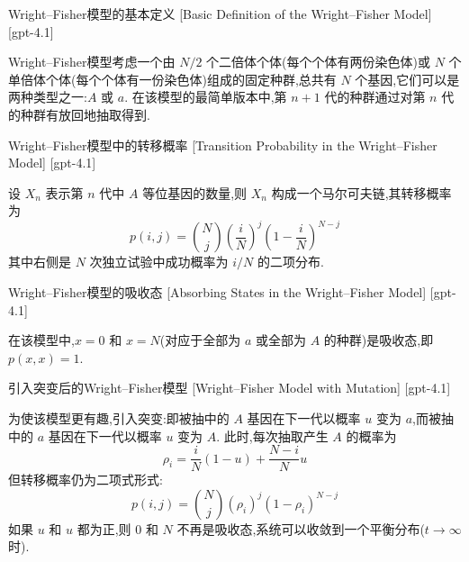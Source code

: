 \documentclass[UTF8]{ctexart}
\begin{document}
    \begin{dfn}
        {Wright–Fisher模型的基本定义}
        [Basic Definition of the Wright–Fisher Model]
        [gpt-4.1]
        
Wright–Fisher模型考虑一个由 $N/2$ 个二倍体个体(每个个体有两份染色体)或 $N$ 个单倍体个体(每个个体有一份染色体)组成的固定种群,总共有 $N$ 个基因,它们可以是两种类型之一:$A$ 或 $a$.
在该模型的最简单版本中,第 $n+1$ 代的种群通过对第 $n$ 代的种群有放回地抽取得到.

    \end{dfn}
    
    
    
    \begin{dfn}
        {Wright–Fisher模型中的转移概率}
        [Transition Probability in the Wright–Fisher Model]
        [gpt-4.1]
        
设 $X_n$ 表示第 $n$ 代中 $A$ 等位基因的数量,则 $X_n$ 构成一个马尔可夫链,其转移概率为
\[
p(i, j) = \binom{N}{j} \left( \frac{i}{N} \right)^{j} \left(1 - \frac{i}{N} \right)^{N - j}
\]
其中右侧是 $N$ 次独立试验中成功概率为 $i/N$ 的二项分布.

    \end{dfn}
    
    
    
    \begin{dfn}
        {Wright–Fisher模型的吸收态}
        [Absorbing States in the Wright–Fisher Model]
        [gpt-4.1]
        
在该模型中,$x = 0$ 和 $x = N$(对应于全部为 $a$ 或全部为 $A$ 的种群)是吸收态,即 $p(x, x) = 1$.

    \end{dfn}
    
    
    
    \begin{dfn}
        {引入突变后的Wright–Fisher模型}
        [Wright–Fisher Model with Mutation]
        [gpt-4.1]
        
为使该模型更有趣,引入突变:即被抽中的 $A$ 基因在下一代以概率 $u$ 变为 $a$,而被抽中的 $a$ 基因在下一代以概率 $
u$ 变为 $A$.
此时,每次抽取产生 $A$ 的概率为
\[
\rho_{i} = \frac{i}{N}(1-u) + \frac{N-i}{N}
u
\]
但转移概率仍为二项式形式:
\[
p(i, j) = \binom{N}{j} (\rho_i)^j (1 - \rho_i)^{N-j}
\]
如果 $u$ 和 $
u$ 都为正,则 $0$ 和 $N$ 不再是吸收态,系统可以收敛到一个平衡分布($t \to \infty$ 时).

    \end{dfn}
    
\end{document}
